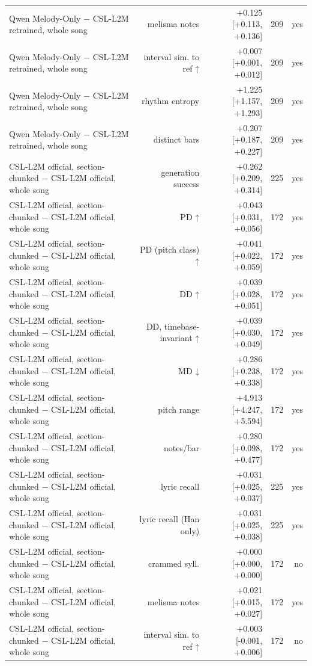 \begin{table}[t]
\begin{tabular}{lrrrr}
Qwen Melody-Only $-$ CSL-L2M retrained, whole song & melisma notes & +0.125 [+0.113, +0.136] & 209 & yes \\
Qwen Melody-Only $-$ CSL-L2M retrained, whole song & interval sim. to ref ↑ & +0.007 [+0.001, +0.012] & 209 & yes \\
Qwen Melody-Only $-$ CSL-L2M retrained, whole song & rhythm entropy & +1.225 [+1.157, +1.293] & 209 & yes \\
Qwen Melody-Only $-$ CSL-L2M retrained, whole song & distinct bars & +0.207 [+0.187, +0.227] & 209 & yes \\
CSL-L2M official, section-chunked $-$ CSL-L2M official, whole song & generation success & +0.262 [+0.209, +0.314] & 225 & yes \\
CSL-L2M official, section-chunked $-$ CSL-L2M official, whole song & PD ↑ & +0.043 [+0.031, +0.056] & 172 & yes \\
CSL-L2M official, section-chunked $-$ CSL-L2M official, whole song & PD (pitch class) ↑ & +0.041 [+0.022, +0.059] & 172 & yes \\
CSL-L2M official, section-chunked $-$ CSL-L2M official, whole song & DD ↑ & +0.039 [+0.028, +0.051] & 172 & yes \\
CSL-L2M official, section-chunked $-$ CSL-L2M official, whole song & DD, timebase-invariant ↑ & +0.039 [+0.030, +0.049] & 172 & yes \\
CSL-L2M official, section-chunked $-$ CSL-L2M official, whole song & MD ↓ & +0.286 [+0.238, +0.338] & 172 & yes \\
CSL-L2M official, section-chunked $-$ CSL-L2M official, whole song & pitch range & +4.913 [+4.247, +5.594] & 172 & yes \\
CSL-L2M official, section-chunked $-$ CSL-L2M official, whole song & notes/bar & +0.280 [+0.098, +0.477] & 172 & yes \\
CSL-L2M official, section-chunked $-$ CSL-L2M official, whole song & lyric recall & +0.031 [+0.025, +0.037] & 225 & yes \\
CSL-L2M official, section-chunked $-$ CSL-L2M official, whole song & lyric recall (Han only) & +0.031 [+0.025, +0.038] & 225 & yes \\
CSL-L2M official, section-chunked $-$ CSL-L2M official, whole song & crammed syll. & +0.000 [+0.000, +0.000] & 172 & no \\
CSL-L2M official, section-chunked $-$ CSL-L2M official, whole song & melisma notes & +0.021 [+0.015, +0.027] & 172 & yes \\
CSL-L2M official, section-chunked $-$ CSL-L2M official, whole song & interval sim. to ref ↑ & +0.003 [-0.001, +0.006] & 172 & no \\

\end{tabular}
\end{table}
